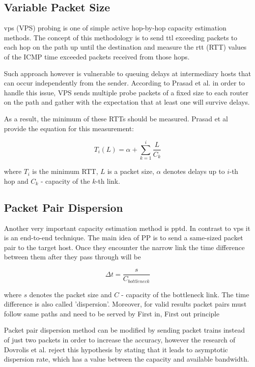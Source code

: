 \subsection{Variable Packet Size}
\acl{vps} (VPS) probing is one of simple active hop-by-hop capacity estimation methods. The concept of this methodology is to send \acl{ttl} exceeding packets to each hop on the path up until the destination and measure the \acl{rtt} (RTT) values of the ICMP time exceeded packets received from those hops\cite{Prasad2003}. 

Such approach however is vulnerable to queuing delays at intermediary hosts that can occur independently from the sender. According to Prasad et al.\cite{Prasad2003} in order to handle this issue, VPS sends multiple probe packets of a fixed size to each router on the path and gather with the expectation that at least one will survive delays.

As a result, the minimum of these RTTs should be measured. Prasad et al\cite{Prasad2003} provide the equation for this measurement:

\[ T_{i}(L) = \alpha + \sum_{k=1}^{i} \frac{L}{C_k} \]

where $T_{i}$ is the minimum RTT, $L$ is a packet size, $\alpha$ denotes delays up to $i$-th hop and $C_k$ - capacity of the $k$-th link.


\subsection{Packet Pair Dispersion}
Another very important capacity estimation method is \acl{pptd}. In contrast to \acl{vps} it is an end-to-end technique. The main idea of PP is to send a same-sized packet pair to the target host. Once they encounter the narrow link the time difference between them after they pass through will be 

\[\Delta t = \frac{s}{C_{bottleneck}}  \]

where $s$ denotes the packet size and $C$ - capacity of the bottleneck link.
The time difference is also called 'dispersion'.
Moreover, for valid results packet pairs must follow same paths and need to be served by First in, First out principle\cite{Abut2018}

Packet pair dispersion method can be modified by sending packet trains instead of just two packets in order to increase the accuracy, however the research of Dovrolis et al. reject this hypothesis by stating that it leads to asymptotic dispersion rate, which has a value between the capacity and available bandwidth\cite{pathrate2004}.

